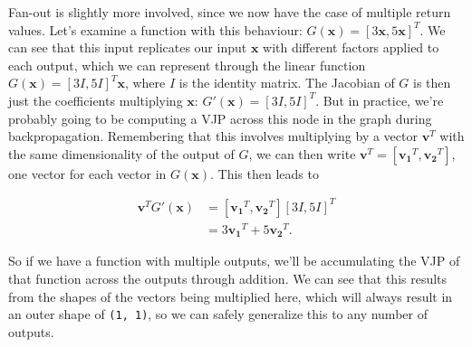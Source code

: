 \documentclass[
  11pt,
  numbers=noendperiod]{book}
\begin{document}
Fan-out is slightly more involved, since we now have the case of
multiple return values. Let's examine a function with this behaviour:
\(G(\mathbf{x}) = [3\mathbf{x}, 5\mathbf{x}]^T\). We can see that this
input replicates our input \(\mathbf{x}\) with different factors applied
to each output, which we can represent through the linear function
\(G(\mathbf{x}) = [3I, 5I]^T\mathbf{x}\), where \(I\) is the identity
matrix. The Jacobian of \(G\) is then just the coefficients multiplying
\(\mathbf{x}\): \(G'(\mathbf{x}) = [3I, 5I]^T\). But in practice, we're
probably going to be computing a VJP across this node in the graph
during backpropagation. Remembering that this involves multiplying by a
vector \(\mathbf{v}^T\) with the same dimensionality of the output of
\(G\), we can then write
\(\mathbf{v}^T = [\mathbf{v_1}^T, \mathbf{v_2}^T]\), one vector for each
vector in \(G(\mathbf{x})\). This then leads to

\begin{align}
\mathbf{v}^TG'(\mathbf{x})  &= [\mathbf{v_1}^T, \mathbf{v_2}^T][3I, 5I]^T \\
&= 3\mathbf{v_1}^T +  5\mathbf{v_2}^T.
\end{align}

So if we have a function with multiple outputs, we'll be accumulating
the VJP of that function across the outputs through addition. We can see
that this results from the shapes of the vectors being multiplied here,
which will always result in an outer shape of \texttt{(1,\ 1)}, so we
can safely generalize this to any number of outputs.
\end{document}

